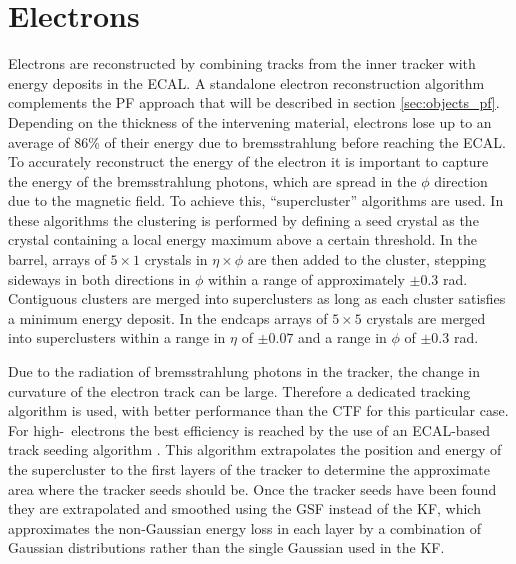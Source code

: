 \section{Electrons}
\label{sec:objects_ele}
Electrons are reconstructed by combining tracks from 
the inner tracker with energy deposits in the \ac{ECAL}.
A standalone electron reconstruction algorithm \cite{cms-elereco-run1} complements the \ac{PF} approach
that will be described in section \ref{sec:objects_pf}.%
Depending on the thickness of the intervening material, electrons lose up to an average of 86\% of their energy 
due to bremsstrahlung before reaching the \ac{ECAL}.
To accurately reconstruct the energy of the electron it is
important to capture the energy of the bremsstrahlung photons, which are spread in the $\phi$ direction
due to the magnetic field. To achieve this, ``supercluster'' algorithms are used.
In these algorithms the clustering
is performed by defining a seed crystal as the crystal containing a local
energy maximum above a certain threshold.
In the barrel, arrays of $5\times 1$ crystals in $\eta \times \phi$ are then added
to the cluster, stepping sideways in both directions in $\phi$ within a range
of approximately $\pm 0.3$ rad. Contiguous clusters are merged into
superclusters as long as each cluster satisfies a minimum energy deposit.
In the endcaps arrays of $5\times 5$ crystals are 
merged into superclusters within a range in $\eta$ of $\pm 0.07$ and a range in $\phi$ of $\pm 0.3$ rad.

Due to the radiation of bremsstrahlung photons in the tracker,
the change in curvature of the electron track can be large. %
Therefore a dedicated tracking algorithm is used, with better performance than the \ac{CTF} for this 
particular case.
For high-\pT~electrons the best efficiency is reached
by the use of an \ac{ECAL}-based track seeding algorithm \cite{cms-elereco-run1}.
This algorithm extrapolates the position and energy of the supercluster to the first
layers of the tracker to determine the approximate area where the tracker seeds should be.
Once the tracker seeds have been found they are extrapolated
and smoothed using the \ac{GSF} \cite{trk-gsf} instead of the \ac{KF}, which 
approximates the non-Gaussian energy loss in each layer by a combination of 
Gaussian distributions rather than the single Gaussian used in the \ac{KF}.

